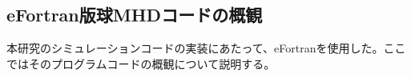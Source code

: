 \documentclass[12pt]{jsarticle}
\begin{document}
\subsection{eFortran版球MHDコードの概観}
本研究のシミュレーションコードの実装にあたって、eFortranを使用した。ここではそのプログラムコードの概観について説明する。


\end{document}
